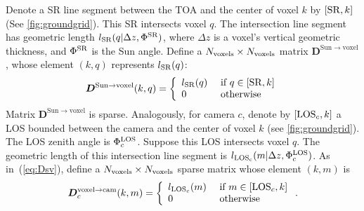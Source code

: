 \documentclass[10pt,letterpaper]{article}
\newcommand{\OpDistance}{\bm{D}}
\begin{document}
Denote a SR line segment between the TOA and the center of voxel $k$
by $[{\rm SR},k]$ (See \cref{fig:groundgrid}). This SR intersects
voxel $q$. The intersection line segment has geometric length $l_{\rm
  SR}(q|\Delta z,\Phi^{\rm SR})$, where $\Delta z$ is a voxel's
vertical geometric thickness, and $\Phi^{\rm SR}$ is the Sun
angle. Define a \mbox{$N_{\rm voxels}\times N_{\rm voxels}$} matrix
$\OpDistance^{\mathrm{Sun \rightarrow voxel}}$, whose element $(k,q)$
represents $l_{\rm SR}(q)$:
\begin{equation}
  \OpDistance^{\mathrm{Sun \rightarrow voxel}}(k,q) =
  \left\{
    \begin{array}{ll}
      l_{\rm SR}(q) & \mbox{ if $q \in[{\rm SR},k]$} \\
      0  & \mbox{ otherwise}
      \label{eq:Dsv}
    \end{array}
  \right.
  \hspace{-0.05cm}
\end{equation}
Matrix $\OpDistance^{\mathrm{Sun \rightarrow voxel}}$ is sparse.
Analogously, for camera $c$, denote by $[{\rm LOS}_c,k]$ a LOS bounded
between the camera and the center of voxel $k$ (see
\cref{fig:groundgrid}).  The LOS zenith angle is $\Phi^{\rm LOS}_c$.
Suppose this LOS intersects voxel $q$. The geometric length of this
intersection line segment is $l_{\rm LOS_c}(m|\Delta z,\Phi^{\rm
  LOS}_c)$.  As in~(\ref{eq:Dsv}), define a $N_{\rm voxels}\times
N_{\rm voxels}$ sparse matrix whose element $(k,m)$ is
\begin{equation}
  \OpDistance^{\mathrm{voxel \rightarrow cam}}_c(k,m) =
  \left\{
    \begin{array}{ll}
      l_{{\rm LOS}_c}(m) & \mbox{ if $m \in[{\rm LOS}_c,k]$} \\
      0  & \mbox{ otherwise}
      \label{eq:Dvc}
    \end{array}
  \right.
  .
  \hspace{-0.05cm}
\end{equation}
\end{document}
